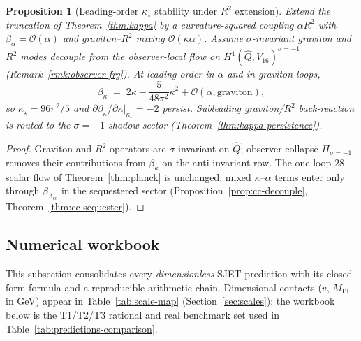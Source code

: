 \documentclass[aps,prd,onecolumn,amsmath,amssymb,nofootinbib,11pt]{revtex4-2}
\numberwithin{equation}{section}
\theoremstyle{plain}
\newtheorem{proposition}[theorem]{Proposition}
\theoremstyle{definition}
\theoremstyle{remark}
\newcommand{\MPl}{M_{\mathrm{Pl}}}
\begin{document}
\begin{proposition}[Leading-order $\kappa_\star$ stability under $R^2$ extension]
\label{prop:kappa-R2}
Extend the truncation of Theorem~\ref{thm:kappa} by a curvature-squared
coupling $\alpha R^2$ with $\beta_\alpha=\mathcal{O}(\alpha)$ and
graviton--$R^2$ mixing $\mathcal{O}(\kappa\alpha)$. Assume
$\sigma$-invariant graviton and $R^2$ modes decouple from the
observer-local flow on $H^1(\hat Q,V_{16})^{\sigma=-1}$
(Remark~\ref{rmk:observer-frg}). At leading order in $\alpha$ and in
graviton loops,
\begin{equation}\label{eq:betakappa-R2}
  \beta_\kappa
  \;=\;
  2\kappa-\frac{5}{48\pi^2}\kappa^2+\mathcal{O}(\alpha,\text{graviton}),
\end{equation}
so $\kappa_\star=96\pi^2/5$ and
$\partial\beta_\kappa/\partial\kappa|_{\kappa_\star}=-2$ persist.
Subleading graviton/$R^2$ back-reaction is routed to the
$\sigma=+1$ shadow sector (Theorem~\ref{thm:kappa-persistence}).
\end{proposition}

\begin{proof}
Graviton and $R^2$ operators are $\sigma$-invariant on $\hat Q$; observer
collapse $\Pi_{\sigma=-1}$ removes their contributions from
$\beta_\kappa$ on the anti-invariant row. The one-loop $28$-scalar flow of
Theorem~\ref{thm:planck} is unchanged; mixed $\kappa$--$\alpha$ terms enter
only through $\beta_{\Lambda_{\mathrm{cc}}}$ in the sequestered sector
(Proposition~\ref{prop:cc-decouple}, Theorem~\ref{thm:cc-sequester}).
\end{proof}

\subsection{Numerical workbook}
\label{sec:appendix:numerical}

This subsection consolidates every \emph{dimensionless} SJET prediction with
its closed-form formula and a reproducible arithmetic chain. Dimensional
contacts ($v$, $\MPl$ in GeV) appear in Table~\ref{tab:scale-map}
(Section~\ref{sec:scales}); the workbook below is the T1/T2/T3 rational and
real benchmark set used in Table~\ref{tab:predictions-comparison}.
\end{document}
